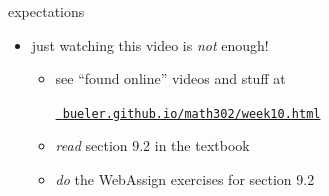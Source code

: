 \documentclass[urlcolor=blue,dvipsnames]{beamer}
\begin{document}
\begin{frame}{expectations}

\begin{itemize}
\item just watching this video is \emph{not} enough!
     \begin{itemize}
     \item see ``found online'' videos and stuff at

     \centerline{\href{https://bueler.github.io/math302/week10.html}{\tt \color{cyan} bueler.github.io/math302/week10.html}}
     \item \emph{read} section 9.2 in the textbook
     \item \emph{do} the WebAssign exercises for section 9.2
     \end{itemize}
\end{itemize}
\end{frame}
\end{document}

